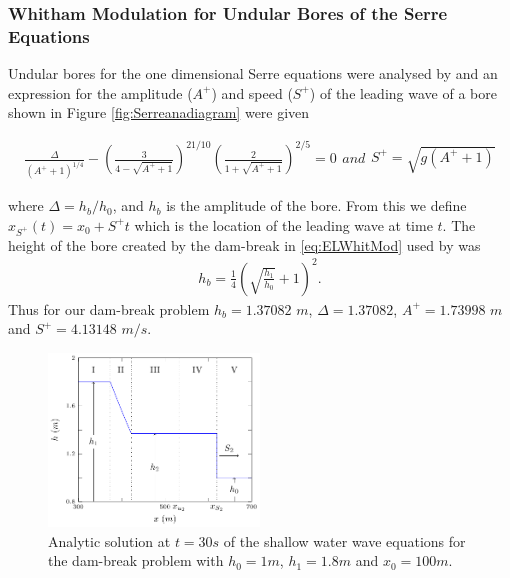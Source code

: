 \documentclass[times]{elsarticle}
\begin{document}
\subsubsection{Whitham Modulation for Undular Bores of the Serre Equations}
Undular bores for the one dimensional Serre equations were analysed by \cite{El-etal-2006} and an expression for the amplitude ($A^+$) and speed ($S^+$) of the leading wave of a bore shown in Figure \ref{fig:Serreanadiagram} were given
\begin{linenomath*}
	\begin{subequations}
\begin{gather}
\frac{\Delta}{\left(A^+ + 1\right)^{1/4}} - \left(\frac{3}{4 -  \sqrt{A^+ + 1}}\right)^{21/10} \left(\frac{2}{1 + \sqrt{A^+ + 1}}\right)^{2/5} = 0
\label{eq:aplusdef}
\end{gather}
and
\begin{gather}
S^+ = \sqrt{g \left(A^+ + 1\right)}
\label{eq:splusdef}
\end{gather}
		\label{eq:ELWhitMod}	
	\end{subequations}
\end{linenomath*}
where $\Delta = h_b / h_0$, and $h_b$ is the amplitude of the bore. From this we define $x_{S^+}(t) = x_0 + S^+t$ which is the location of the leading wave at time $t$.
The height of the bore created by the dam-break in \eqref{eq:ELWhitMod} used by \citet{El-etal-2006} was
\begin{gather*}
\label{eqn:hrdef}
h_b = \frac{1}{4}\left(\sqrt{\frac{h_1}{h_0}} + 1\right)^2.
\end{gather*} 
Thus for our dam-break problem $h_b = 1.37082$ $m$, $\Delta = 1.37082$,  $A^+ = 1.73998$ $m$ and $S^+ = 4.13148$ $m/s$.

\begin{figure}
\centering
\includegraphics[width=0.5\textwidth]{pics/explainers/SWWEana.pdf}
\caption{Analytic solution at $t=30s$ of the shallow water wave equations for the dam-break problem with $h_0 = 1m$, $h_1=1.8m$ and $x_0=100m$.}
\label{fig:SWWEanadiagram}
\end{figure}
\end{document}
